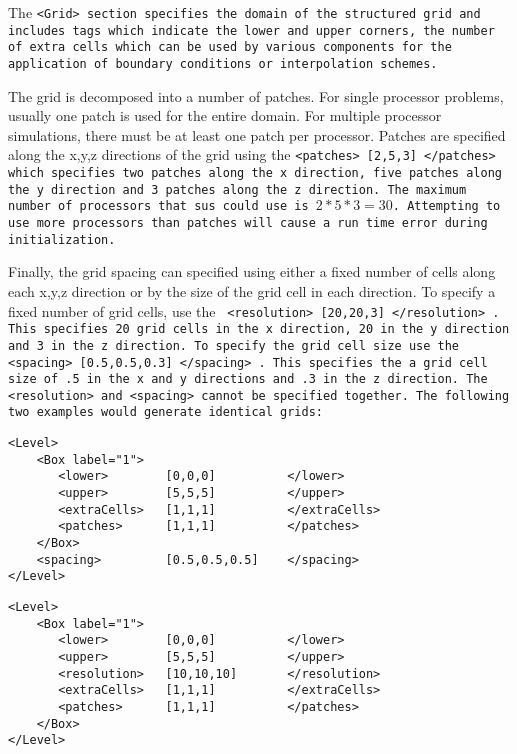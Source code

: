The \tt <Grid> \normalfont section specifies the domain of the
structured grid and includes tags which indicate the lower and upper
corners, the number of extra cells which can be used by various
components for the application of boundary conditions or interpolation
schemes.  

The grid is decomposed into a number of patches.  For single processor
problems, usually one patch is used for the entire domain.  For
multiple processor simulations, there must be at least one patch per
processor.  Patches are specified along the x,y,z directions of the
grid using the \tt <patches> [2,5,3] </patches> \normalfont which
specifies two patches along the x direction, five patches along the y
direction and 3 patches along the z direction.  The maximum number of
processors that \tt sus \normalfont could use is $2*5*3 = 30$.
Attempting to use more processors than patches
will cause a run time error during initialization.

Finally, the grid spacing can specified using either a fixed number of
cells along each x,y,z direction or by the size of the grid cell in
each direction.  To specify a fixed number of grid cells, use the \tt
<resolution> [20,20,3] </resolution> \normalfont.  This specifies 20
grid cells in the x direction, 20 in the y direction and 3 in the z
direction.  To specify the grid cell size use the \tt <spacing>
[0.5,0.5,0.3] </spacing> \normalfont.  This specifies the a grid cell
size of .5 in the x and y directions and .3 in the z direction.  The
\tt <resolution> \normalfont and \tt <spacing> \normalfont cannot be
specified together.  The following two examples would generate
identical grids:

\begin{Verbatim}[fontsize=\footnotesize]
<Level>
    <Box label="1">
       <lower>        [0,0,0]          </lower>
       <upper>        [5,5,5]          </upper>
       <extraCells>   [1,1,1]          </extraCells>
       <patches>      [1,1,1]          </patches>
    </Box>
    <spacing>         [0.5,0.5,0.5]    </spacing>
</Level>
\end{Verbatim}

\begin{Verbatim}[fontsize=\footnotesize]
<Level>
    <Box label="1">
       <lower>        [0,0,0]          </lower>
       <upper>        [5,5,5]          </upper>
       <resolution>   [10,10,10]       </resolution>
       <extraCells>   [1,1,1]          </extraCells>
       <patches>      [1,1,1]          </patches>
    </Box>
</Level>
\end{Verbatim}


